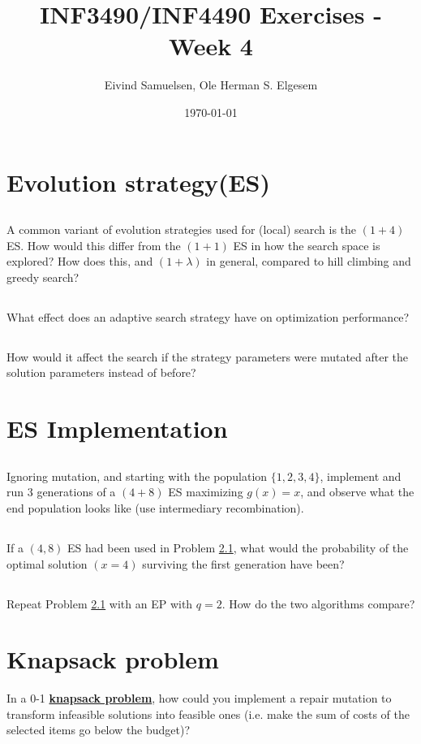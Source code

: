 \documentclass{article}           %
\title{\vspace{-2cm}INF3490/INF4490 Exercises - Week 4}
\author{Eivind Samuelsen, Ole Herman S. Elgesem}
\date{\today}
\newcommand\marginsymbol[1][0pt]{%
  \tabto*{0cm}\makebox[\dimexpr-1cm-#1\relax][r]{$\mathbb{P}$}\tabto*{\TabPrevPos}}
\begin{document}
    \renewcommand\marginsymbol[1][0pt]{%
  \tabto*{0cm}\makebox[-1cm][c]{$\mathbb{P}$}\tabto*{\TabPrevPos}}

\maketitle


\section{Evolution strategy(ES)} %
\subsection{} %
A common variant of evolution strategies used for (local) search is the \((1 + 4)\) ES.
How would this differ from the \((1 + 1)\) ES in how the search space is explored?
How does this, and \((1 + \lambda)\) in general, compared to hill climbing and greedy search?
\subsection{} %
What effect does an adaptive search strategy have on optimization performance?
\subsection{} %
How would it affect the search if the strategy parameters were mutated after the solution parameters instead of before?
\section{ES Implementation} %
\subsection{\marginsymbol} %
\label{subsec:w4e3a}
Ignoring mutation, and starting with the population \(\{1, 2, 3, 4\}\),
implement and run 3 generations of a \((4 + 8)\) ES maximizing \(g(x) = x\),
and observe what the end population looks like (use intermediary recombination).
\subsection{} %
If a \((4, 8)\) ES had been used in Problem \ref{subsec:w4e3a},
what would the probability of the optimal solution \((x = 4)\) surviving the first generation have been?
\subsection{\marginsymbol} %
Repeat Problem \ref{subsec:w4e3a} with an EP with \(q = 2\).
How do the two algorithms compare?
\section{Knapsack problem}
In a 0-1 \href{https://en.wikipedia.org/wiki/Knapsack_problem}{\textbf{knapsack problem}},
how could you implement a repair mutation to transform infeasible solutions into feasible ones
(i.e. make the sum of costs of the selected items go below the budget)?


\end{document}
